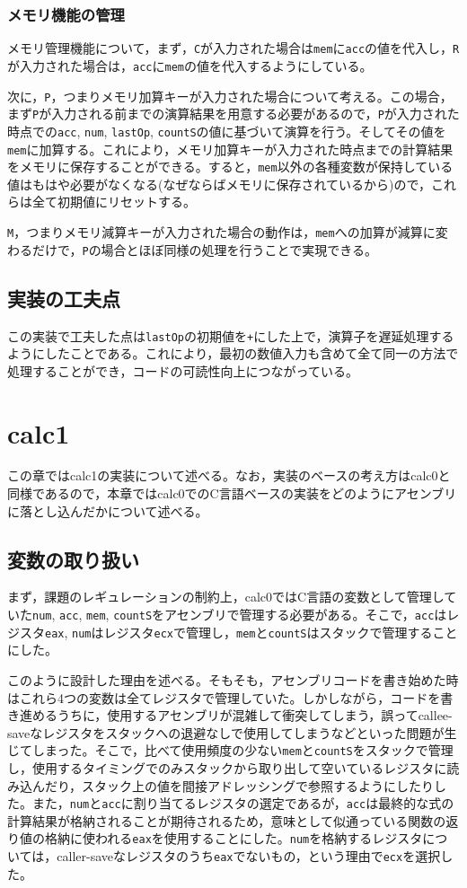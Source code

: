 \documentclass[a4paper]{jsarticle}
\newcommand{\var}[1]{\texttt{#1}}
\begin{document}
\subsubsection{メモリ機能の管理}
メモリ管理機能について，まず，\var{C}が入力された場合は\var{mem}に\var{acc}の値を代入し，\var{R}が入力された場合は，\var{acc}に\var{mem}の値を代入するようにしている。

次に，\var{P}，つまりメモリ加算キーが入力された場合について考える。この場合，まず\var{P}が入力される前までの演算結果を用意する必要があるので，\var{P}が入力された時点での\var{acc}, \var{num}, \var{lastOp}, \var{countS}の値に基づいて演算を行う。そしてその値を\var{mem}に加算する。これにより，メモリ加算キーが入力された時点までの計算結果をメモリに保存することができる。すると，\var{mem}以外の各種変数が保持している値はもはや必要がなくなる(なぜならばメモリに保存されているから)ので，これらは全て初期値にリセットする。

\var{M}，つまりメモリ減算キーが入力された場合の動作は，\var{mem}への加算が減算に変わるだけで，\var{P}の場合とほぼ同様の処理を行うことで実現できる。

\subsection{実装の工夫点}
この実装で工夫した点は\var{lastOp}の初期値を\var{+}にした上で，演算子を遅延処理するようにしたことである。これにより，最初の数値入力も含めて全て同一の方法で処理することができ，コードの可読性向上につながっている。

\section{calc1}
この章ではcalc1の実装について述べる。なお，実装のベースの考え方はcalc0と同様であるので，本章ではcalc0でのC言語ベースの実装をどのようにアセンブリに落とし込んだかについて述べる。

\subsection{変数の取り扱い}
まず，課題のレギュレーションの制約上，calc0ではC言語の変数として管理していた\var{num}, \var{acc}, \var{mem}, \var{countS}をアセンブリで管理する必要がある。そこで，\var{acc}はレジスタ\var{eax}, \var{num}はレジスタ\var{ecx}で管理し，\var{mem}と\var{countS}はスタックで管理することにした。

このように設計した理由を述べる。そもそも，アセンブリコードを書き始めた時はこれら4つの変数は全てレジスタで管理していた。しかしながら，コードを書き進めるうちに，使用するアセンブリが混雑して衝突してしまう，誤ってcallee-saveなレジスタをスタックへの退避なしで使用してしまうなどといった問題が生じてしまった。そこで，比べて使用頻度の少ない\var{mem}と\var{countS}をスタックで管理し，使用するタイミングでのみスタックから取り出して空いているレジスタに読み込んだり，スタック上の値を間接アドレッシングで参照するようにしたりした。また，\var{num}と\var{acc}に割り当てるレジスタの選定であるが，\var{acc}は最終的な式の計算結果が格納されることが期待されるため，意味として似通っている関数の返り値の格納に使われる\var{eax}を使用することにした。\var{num}を格納するレジスタについては，caller-saveなレジスタのうち\var{eax}でないもの，という理由で\var{ecx}を選択した。
\end{document}
